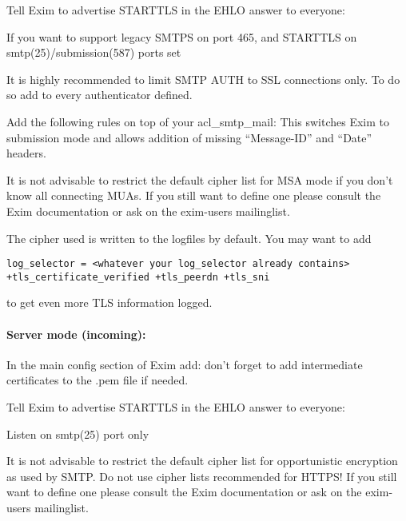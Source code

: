Tell Exim to advertise STARTTLS in the EHLO answer to everyone:

If you want to support legacy SMTPS on port 465, and STARTTLS on smtp(25)/submission(587) ports set

It is highly recommended to limit SMTP AUTH to SSL connections only. To do so add
to every authenticator defined.

Add the following rules on top of your acl\_smtp\_mail:
This switches Exim to submission mode and allows addition of missing ``Message-ID'' and ``Date'' headers.

It is not advisable to restrict the default cipher list for MSA mode if you don't know all connecting MUAs. If you still want to define one please consult the Exim documentation or ask on the exim-users mailinglist.

The cipher used is written to the logfiles by default. You may want to add
\begin{lstlisting}
log_selector = <whatever your log_selector already contains> +tls_certificate_verified +tls_peerdn +tls_sni
\end{lstlisting}
to get even more TLS information logged.


\paragraph{Server mode (incoming):}
In the main config section of Exim add:
don't forget to add intermediate certificates to the .pem file if needed.

Tell Exim to advertise STARTTLS in the EHLO answer to everyone:

Listen on smtp(25) port only

It is not advisable to restrict the default cipher list for opportunistic encryption as used by SMTP. Do not use cipher lists recommended for HTTPS! If you still want to define one please consult the Exim documentation or ask on the exim-users mailinglist.

